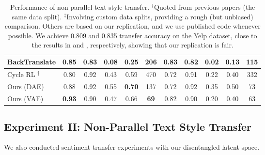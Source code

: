 \documentclass[letterpaper]{article} %
\begin{document}
\begin{table}[!t]
{\begin{tabular}{|l||c|c|c|c|c||c|c|c|c|c| }
			BackTranslate \cite{prabhumoye2018style}            & 0.85                                        & 0.83                                         & 0.08             & 0.25          & 206                           & \textbf{0.83}     & 0.82            & 0.02             & 0.13          & 115                           \\ \hline
			Cycle RL \cite{xu2018unpaired} $^\ddag$             & 0.80                                        & 0.92                                         & 0.43             & 0.59          & 470                           & 0.72              & 0.91            & 0.22             & 0.40          & 332                           \\ \hline\hline
			Ours (DAE)                                          & 0.88                                        & 0.92                                         & 0.55             & \textbf{0.70} & 137                           & 0.72              & 0.92            & 0.35             & 0.50          & 73                            \\ \hline
			Ours (VAE)                                          & \textbf{0.93}                               & 0.90                                         & 0.47             & 0.66          & \textbf{69}                   & 0.82              & 0.90            & 0.20             & 0.40          & 63                            \\ \hline
		\end{tabular}}\vspace{-.2cm}
	\caption{Performance of non-parallel text style transfer.  $^\dag$Quoted from previous papers (the same data split). $^\ddag$Involving custom data splits, providing a rough (but unbiased) comparison. Others are based on our replication, and we use published code whenever possible. We achieve 0.809 and 0.835 transfer accuracy on the Yelp dataset, close to the results in \citet{shen2017style} and \citet{zhao2018adversarially}, respectively, showing that our replication is fair.}\vspace{-.2cm}
	\label{tab:yelp-comparison-previous}
\end{table}


\subsection{Experiment II: Non-Parallel Text Style Transfer}
We also conducted sentiment transfer experiments with our disentangled latent space.
\end{document}
